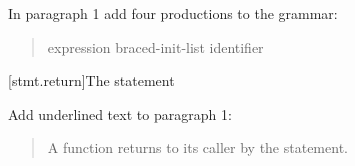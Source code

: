 In paragraph 1 add four productions to the grammar:

\begin{quote}
\begin{bnf}
	\br
	\br
	\br
	 expression\opt \terminal{;}\br
	 braced-init-list \terminal{;}\br
	\br
  \br
  \br
	\br
	 identifier \terminal{;}
\end{bnf}
\end{quote}

\setcounter{subsection}{2}
[stmt.return]{The  statement}%
%
%

Add underlined text to paragraph 1:

\begin{quote}
\pnum
A function returns to its caller by the  statement.
\end{quote}


%


